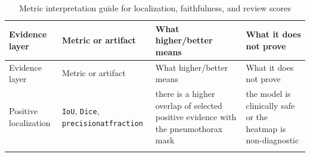 \begin{longtable}[]{@{}llll@{}}
	\caption{Metric interpretation guide for localization, faithfulness, and
		review scores}\tabularnewline
	\toprule
	\begin{minipage}[b]{0.22\columnwidth}\raggedright
		Evidence layer\strut
	\end{minipage} & \begin{minipage}[b]{0.22\columnwidth}\raggedright
		Metric or artifact\strut
	\end{minipage} & \begin{minipage}[b]{0.22\columnwidth}\raggedright
		What higher/better means\strut
	\end{minipage} & \begin{minipage}[b]{0.22\columnwidth}\raggedright
		What it does not prove\strut
	\end{minipage}\tabularnewline
	\midrule
	\endfirsthead
	\toprule
	\begin{minipage}[b]{0.22\columnwidth}\raggedright
		Evidence layer\strut
	\end{minipage} & \begin{minipage}[b]{0.22\columnwidth}\raggedright
		Metric or artifact\strut
	\end{minipage} & \begin{minipage}[b]{0.22\columnwidth}\raggedright
		What higher/better means\strut
	\end{minipage} & \begin{minipage}[b]{0.22\columnwidth}\raggedright
		What it does not prove\strut
	\end{minipage}\tabularnewline
	\midrule
	\endhead
	\begin{minipage}[t]{0.22\columnwidth}\raggedright
		Positive localization\strut
	\end{minipage} & \begin{minipage}[t]{0.22\columnwidth}\raggedright
		\texttt{IoU}, \texttt{Dice}, \texttt{precision\allowbreak at\allowbreak fraction}\strut
	\end{minipage} & \begin{minipage}[t]{0.22\columnwidth}\raggedright
		there is a higher overlap of selected positive evidence with the pneumothorax mask\strut
	\end{minipage} & \begin{minipage}[t]{0.22\columnwidth}\raggedright
		the model is clinically safe or the heatmap is non-diagnostic\strut
	\end{minipage}\tabularnewline
	\begin{minipage}[t]{0.22\columnwidth}\raggedright

\end{minipage}
\end{longtable}
